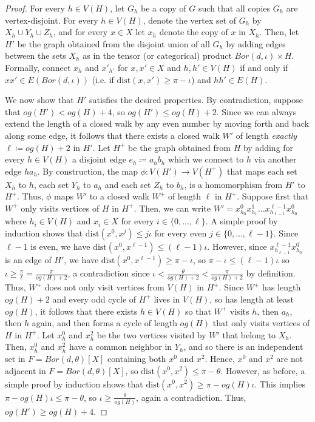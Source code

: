 \documentclass{article}
\newcommand{\dist}{\text{dist}}
\begin{document}
\begin{proof}
    For every $h \in V(H)$, let $G_h$ be a copy of $G$ such that all copies $G_h$ are vertex-disjoint.
    For every $h \in V(H)$, denote the vertex set of $G_h$ by $X_h \cup Y_h \cup Z_h$, and for every $x \in X$ let $x_h$ denote the copy of $x$ in $X_h$.
    Then, let $H'$ be the graph obtained from the disjoint union of all $G_h$ by adding edges between the sets $X_h$ as in the tensor (or categorical) product $Bor(d, \iota) \times H$.
    Formally, connect $x_h$ and $x'_{h'}$ for $x, x' \in X$ and $h, h' \in V(H)$ if and only if $xx' \in E(Bor(d, \iota))$ (i.e. if $\dist(x, x') \geq \pi - \iota$) and $hh' \in E(H)$.

    We now show that $H'$ satisfies the desired properties.
    By contradiction, suppose that $og(H') < og(H) + 4$, so $og(H') \leq og(H) + 2$.
    Since we can always extend the length of a closed walk by any even number by moving forth and back along some edge, it follows that there exists a closed walk $W'$ of length \emph{exactly} $\ell \coloneqq og(H) + 2$ in $H'$.
    Let $H^+$ be the graph obtained from $H$ by adding for every $h \in V(H)$ a disjoint edge $e_h \coloneqq a_hb_h$ which we connect to $h$ via another edge $ha_h$. 
    By construction, the map $\phi : V(H') \to V(H^+)$ that maps each set $X_h$ to $h$, each set $Y_h$ to $a_h$ and each set $Z_h$ to $b_h$, is a homomorphism from $H'$ to $H^+$.
    Thus, $\phi$ maps $W'$ to a closed walk $W^+$ of length $\ell$ in $H^+$.
    Suppose first that $W^+$ only visits vertices of $H$ in $H^+$.
    Then, we can write $W' = x^0_{h_0}x^1_{h_1}\ldots x^{\ell-1}_{h_{\ell-1}}x^0_{h_0}$ where $h_i \in V(H)$ and $x_i \in X$ for every $i \in \{0, \ldots, \ell\}$.
    A simple proof by induction shows that $\dist(x^0, x^j) \leq j\iota$ for every even $j \in \{0, \ldots, \ell-1\}$.
    Since $\ell-1$ is even, we have $\dist(x^0, x^{\ell-1}) \leq (\ell-1)\iota$.
    However, since $x^{\ell-1}_{h_{\ell-1}}x^0_{h_0}$ is an edge of $H'$, we have $\dist(x^{0}, x^{\ell-1}) \geq \pi-\iota$, so $\pi-\iota \leq (\ell-1)\iota$ so $\iota \geq \frac{\pi}{\ell} = \frac{\pi}{og(H)+2}$, a contradiction since $\iota < \frac{\theta}{og(H)+2} < \frac{\pi}{og(H)+2}$ by definition.
    Thus, $W^+$ does not only visit vertices from $V(H)$ in $H^+$.
    Since $W^+$ has length $og(H)+2$ and every odd cycle of $H^+$ lives in $V(H)$, so has length at least $og(H)$, it follows that there exists $h \in V(H)$ so that $W^+$ visits $h$, then $a_h$, then $h$ again, and then forms a cycle of length $og(H)$ that only visits vertices of $H$ in $H^+$.
    Let $x^0_h$ and $x^2_h$ be the two vertices visited by $W'$ that belong to $X_h$.
    Then, $x^0_h$ and $x^2_h$ have a common neighbor in $Y_h$, and so there is an independent set in $F = Bor(d, \theta)[X]$ containing both $x^0$ and $x^2$. Hence, $x^0$ and $x^2$ are not adjacent in $F = Bor(d, \theta)[X]$, so $\dist(x^0, x^2) \leq \pi - \theta$.
    However, as before, a simple proof by induction shows that $\dist(x^0, x^2) \geq \pi - og(H)\iota$.
    This implies $\pi-og(H)\iota \leq \pi - \theta$, so $\iota \geq \frac{\theta}{og(H)}$, again a contradiction.
    Thus, $og(H') \geq og(H) + 4$.
    


\end{proof}
\end{document}
